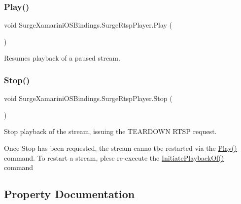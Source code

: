 \subsubsection{\texorpdfstring{Play()}{Play()}}
{\footnotesize\ttfamily void Surge\+Xamarini\+O\+S\+Bindings.\+Surge\+Rtsp\+Player.\+Play (\begin{DoxyParamCaption}{ }\end{DoxyParamCaption})}



Resumes playback of a paused stream. 

\mbox{\label{interface_surge_xamarini_o_s_bindings_1_1_surge_rtsp_player_ac4cb8b34437ee896e4529cddca339bed}} 
\subsubsection{\texorpdfstring{Stop()}{Stop()}}
{\footnotesize\ttfamily void Surge\+Xamarini\+O\+S\+Bindings.\+Surge\+Rtsp\+Player.\+Stop (\begin{DoxyParamCaption}{ }\end{DoxyParamCaption})}



Stop playback of the stream, issuing the T\+E\+A\+R\+D\+O\+WN R\+T\+SP request. 

Once Stop has been requested, the stream canno tbe restarted via the \hyperlink{interface_surge_xamarini_o_s_bindings_1_1_surge_rtsp_player_a3f7d8277f7aa65454732afd623ee53af}{Play()} command. To restart a stream, plese re-\/execute the \hyperlink{interface_surge_xamarini_o_s_bindings_1_1_surge_rtsp_player_a7c2572b559c1758415a21c0bde4417be}{Initiate\+Playback\+Of()} command 

\subsection{Property Documentation}
\mbox{\label{interface_surge_xamarini_o_s_bindings_1_1_surge_rtsp_player_a6c7ed65f9656542894f0ccfe7e728b0e}} 
